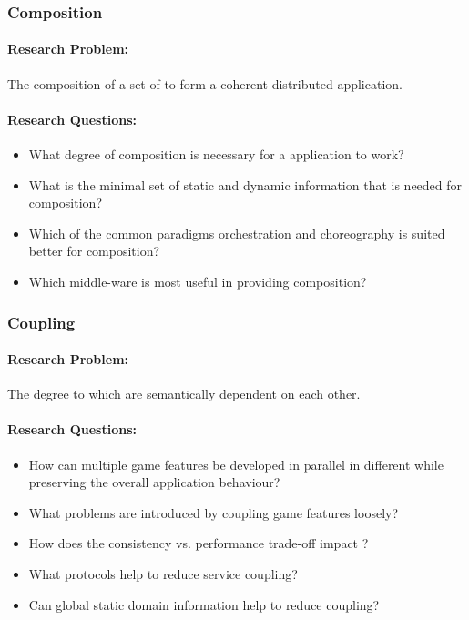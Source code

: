 \subsubsection{\ms{} Composition}
\paragraph{Research Problem:} The composition of a set of \mss{} to form a coherent
distributed application.

\paragraph{Research Questions:}
\begin{itemize}
  \item What degree of composition is necessary for a \ms{} application to work?
  \item What is the minimal set of static and dynamic information that is needed
  for \ms{} composition?
  \item Which of the common paradigms orchestration and choreography is suited
  better for \ms{} composition?
  \item Which middle-ware is most useful in providing \ms{} composition?
\end{itemize}

\subsubsection{\ms{} Coupling}
\paragraph{Research Problem:} The degree to which \mss{} are semantically
dependent on each other. 

\paragraph{Research Questions:}
\begin{itemize}
  \item How can multiple game features be developed in parallel in different
  \mss{} while preserving the overall application behaviour?
  \item What problems are introduced by coupling game features loosely? 
  \item How does the consistency vs. performance trade-off impact \ogs{}?
  \item What protocols help to reduce service coupling?
  \item Can global static domain information help to reduce \ms{} coupling?
\end{itemize}


